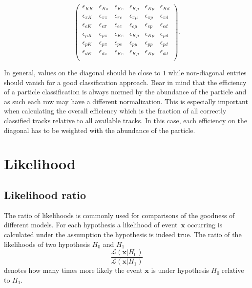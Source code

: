 \begin{equation}
	\begin{pmatrix}
		\epsilon_{K K} & \epsilon_{K \pi} & \epsilon_{K e} & \epsilon_{K \mu} & \epsilon_{K p} & \epsilon_{K d} \\
		\epsilon_{\pi K} & \epsilon_{\pi \pi} & \epsilon_{\pi e} & \epsilon_{\pi \mu} & \epsilon_{\pi p} & \epsilon_{\pi d} \\
		\epsilon_{e K} & \epsilon_{e \pi} & \epsilon_{e e} & \epsilon_{e \mu} & \epsilon_{e p} & \epsilon_{e d} \\
		\epsilon_{\mu K} & \epsilon_{\mu \pi} & \epsilon_{K e} & \epsilon_{K \mu} & \epsilon_{K p} & \epsilon_{\mu d} \\
		\epsilon_{p K} & \epsilon_{p \pi} & \epsilon_{p e} & \epsilon_{p \mu} & \epsilon_{p p} & \epsilon_{p d} \\
		\epsilon_{d K} & \epsilon_{d \pi} & \epsilon_{K e} & \epsilon_{K \mu} & \epsilon_{K p} & \epsilon_{d d} \\
	\end{pmatrix}.
\end{equation}

In general, values on the diagonal should be close to $1$ while non-diagonal entries should vanish for a good classification approach. Bear in mind that the efficiency of a particle classification is always normed by the abundance of the particle and as such each row may have a different normalization. This is especially important when calculating the overall efficiency which is the fraction of all correctly classified tracks relative to all available tracks. In this case, each efficiency on the diagonal has to be weighted with the abundance of the particle.

\section{Likelihood}
\label{sec:likelihood}

\subsection{Likelihood ratio}
\label{subsec:likelihood_ratios}

The ratio of likelihoods is commonly used for comparisons of the goodness of different models. For each hypothesis a likelihood of event~$\pmb{x}$ occurring is calculated under the assumption the hypothesis is indeed true. The ratio of the likelihoods of two hypothesis $H_0$ and $H_1$
\begin{equation}
	\frac{\mathcal{L}(\pmb{x}|H_0)}{\mathcal{L}(\pmb{x}|H_1)}
\end{equation}
denotes how many times more likely the event $\pmb{x}$ is under hypothesis $H_0$ relative to $H_1$.

